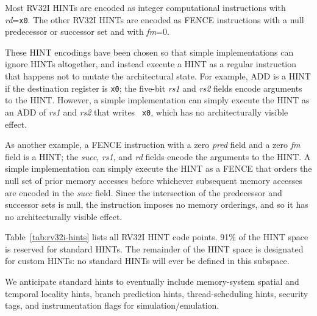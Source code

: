 Most RV32I HINTs are encoded as integer computational instructions with
{\em rd}={\tt x0}.
The other RV32I HINTs are encoded as FENCE instructions with a null
predecessor or successor set and with {\em fm}=0.

\begin{commentary}
These HINT encodings have been chosen so that simple implementations can ignore
HINTs altogether, and instead execute a HINT as a regular
instruction that happens not to mutate the architectural state.  For example, ADD is
a HINT if the destination register is {\tt x0}; the five-bit {\em rs1} and {\em
rs2} fields encode arguments to the HINT.  However, a simple implementation can
simply execute the HINT as an ADD of {\em rs1} and {\em rs2} that writes {\tt
x0}, which has no architecturally visible effect.

As another example, a FENCE instruction with a zero {\em pred} field and
a zero {\em fm} field is a HINT; the {\em succ}, {\em rs1}, and {\em rd}
fields encode the arguments to the HINT.
A simple implementation can simply execute the HINT as a FENCE that orders the
null set of prior memory accesses before whichever subsequent memory accesses
are encoded in the {\em succ} field.
Since the intersection of the predecessor and successor sets is null, the
instruction imposes no memory orderings, and so it has no architecturally
visible effect.
\end{commentary}

Table~\ref{tab:rv32i-hints} lists all RV32I HINT code points.  91\% of the HINT
space is reserved for standard HINTs.  The
remainder of the HINT space is designated for custom HINTs: no standard HINTs
will ever be defined in this subspace.

\begin{commentary}
We anticipate
standard hints to eventually include memory-system spatial and
temporal locality hints, branch prediction hints, thread-scheduling
hints, security tags, and instrumentation flags for
simulation/emulation.
\end{commentary}

